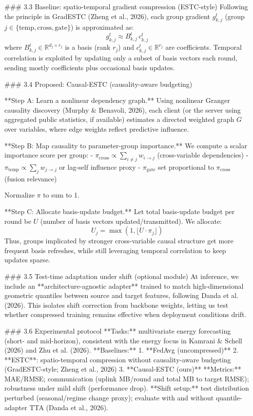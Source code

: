 ### 3.3 Baseline: spatio-temporal gradient compression (ESTC-style)  
Following the principle in GradESTC (Zheng et al., 2026), each group gradient \(g_{k,j}^t\) (group \(j\in\{\text{temp},\text{cross},\text{gate}\}\)) is approximated as:
\[
g_{k,j}^t \approx B_{k,j}^t \, c_{k,j}^t
\]
where \(B_{k,j}^t\in\mathbb{R}^{d_j \times r_j}\) is a basis (rank \(r_j\)) and \(c_{k,j}^t\in\mathbb{R}^{r_j}\) are coefficients. Temporal correlation is exploited by updating only a subset of basis vectors each round, sending mostly coefficients plus occasional basis updates.

### 3.4 Proposed: Causal-ESTC (causality-aware budgeting)  

**Step A: Learn a nonlinear dependency graph.**  
Using nonlinear Granger causality discovery (Murphy & Benavoli, 2026), each client (or the server using aggregated public statistics, if available) estimates a directed weighted graph \(G\) over variables, where edge weights reflect predictive influence.

**Step B: Map causality to parameter-group importance.**  
We compute a scalar importance score per group:
- \(\pi_{\text{cross}} \propto \sum_{i\neq j} w_{i\to j}\) (cross-variable dependencies)
- \(\pi_{\text{temp}} \propto \sum_{j} w_{j\to j}\) or lag-self influence proxy
- \(\pi_{\text{gate}}\) set proportional to \(\pi_{\text{cross}}\) (fusion relevance)

Normalize \(\pi\) to sum to 1.

**Step C: Allocate basis-update budget.**  
Let total basis-update budget per round be \(U\) (number of basis vectors updated/transmitted). We allocate:
\[
U_j = \max(1,\lfloor U \cdot \pi_j \rfloor)
\]
Thus, groups implicated by stronger cross-variable causal structure get more frequent basis refreshes, while still leveraging temporal correlation to keep updates sparse.

### 3.5 Test-time adaptation under shift (optional module)  
At inference, we include an **architecture-agnostic adapter** trained to match high-dimensional geometric quantiles between source and target features, following Danda et al. (2026). This isolates shift correction from backbone weights, letting us test whether compressed training remains effective when deployment conditions drift.

### 3.6 Experimental protocol  
**Tasks:** multivariate energy forecasting (short- and mid-horizon), consistent with the energy focus in Kamrani & Schell (2026) and Zhu et al. (2026).  
**Baselines:**
1. **FedAvg (uncompressed)**  
2. **ESTC**: spatio-temporal compression without causality-aware budgeting (GradESTC-style; Zheng et al., 2026)  
3. **Causal-ESTC (ours)**  
**Metrics:** MAE/RMSE; communication (uplink MB/round and total MB to target RMSE); robustness under mild shift (performance drop).  
**Shift setup:** test distribution perturbed (seasonal/regime change proxy); evaluate with and without quantile-adapter TTA (Danda et al., 2026).

